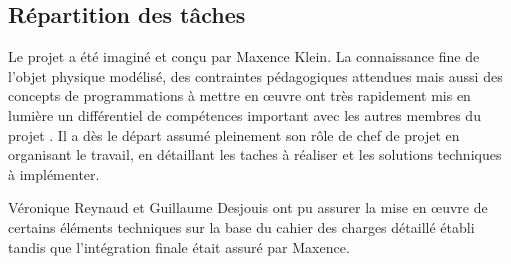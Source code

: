 \documentclass[10pt]{scrreprt} %
\begin{document}
\subsection{Répartition des tâches}

Le projet a été imaginé et conçu par Maxence Klein. La connaissance fine de l'objet physique modélisé, des contraintes pédagogiques attendues mais aussi des concepts de programmations à mettre en \oe uvre ont très rapidement mis en lumière un différentiel de compétences important avec les autres membres du projet . Il a dès le départ assumé pleinement son rôle de chef de projet en organisant le travail, en détaillant les taches à réaliser et les solutions techniques à implémenter. 

Véronique Reynaud et Guillaume Desjouis ont pu assurer la mise en \oe uvre de certains éléments techniques sur la base du cahier des charges détaillé établi tandis que l'intégration finale était assuré par Maxence.

\begin{appendix}
\listoffigures
\begingroup
\let\clearpage\relax
\listoftables
\endgroup
\end{appendix}
\end{document}
